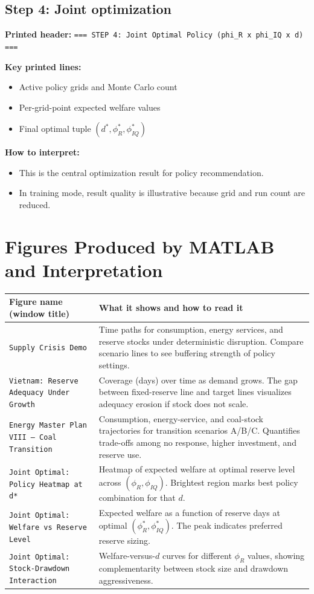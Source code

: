 \documentclass[11pt]{article}
\begin{document}
\subsection*{Step 4: Joint optimization}
\textbf{Printed header:} \texttt{=== STEP 4: Joint Optimal Policy (phi\_R x phi\_IQ x d) ===}

\textbf{Key printed lines:}
\begin{itemize}
\item Active policy grids and Monte Carlo count
\item Per-grid-point expected welfare values
\item Final optimal tuple $(d^*, \phi_R^*, \phi_{IQ}^*)$
\end{itemize}

\textbf{How to interpret:}
\begin{itemize}
\item This is the central optimization result for policy recommendation.
\item In training mode, result quality is illustrative because grid and run count are reduced.
\end{itemize}

\section{Figures Produced by MATLAB and Interpretation}
\begin{longtable}{>{\raggedright\arraybackslash}p{} >{\raggedright\arraybackslash}p{}}
\toprule
\textbf{Figure name (window title)} & \textbf{What it shows and how to read it} \\
\midrule
\texttt{Supply Crisis Demo} & Time paths for consumption, energy services, and reserve stocks under deterministic disruption. Compare scenario lines to see buffering strength of policy settings. \\
\texttt{Vietnam: Reserve Adequacy Under Growth} & Coverage (days) over time as demand grows. The gap between fixed-reserve line and target lines visualizes adequacy erosion if stock does not scale. \\
\texttt{Energy Master Plan VIII --- Coal Transition} & Consumption, energy-service, and coal-stock trajectories for transition scenarios A/B/C. Quantifies trade-offs among no response, higher investment, and reserve use. \\
\texttt{Joint Optimal: Policy Heatmap at d*} & Heatmap of expected welfare at optimal reserve level across $(\phi_R, \phi_{IQ})$. Brightest region marks best policy combination for that $d$. \\
\texttt{Joint Optimal: Welfare vs Reserve Level} & Expected welfare as a function of reserve days at optimal $(\phi_R^*, \phi_{IQ}^*)$. The peak indicates preferred reserve sizing. \\
\texttt{Joint Optimal: Stock-Drawdown Interaction} & Welfare-versus-$d$ curves for different $\phi_R$ values, showing complementarity between stock size and drawdown aggressiveness. \\
\bottomrule
\end{longtable}
\end{document}
